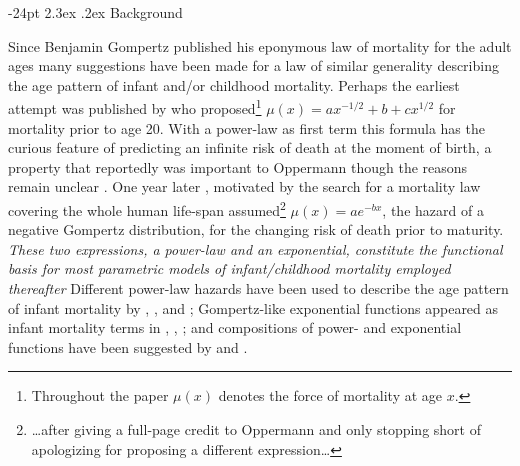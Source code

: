 \documentclass[10pt, twoside, parskip=half]{article}
\makeatletter
\renewcommand\section{\@startsection {section}{1}{\z@}%
                                   {-24pt}%
                                   {2.3ex \@plus.2ex}%
                                   {\normalfont\large\bfseries}}
\makeatother
\begin{document}
\setlength{\parskip}{0ex}

\newpage

\section{Background}\label{background}

Since Benjamin Gompertz published his eponymous law of mortality for the
adult ages many suggestions have been made for a law of similar
generality describing the age pattern of infant and/or childhood
mortality. Perhaps the earliest attempt was published by
\citet{Oppermann1870} who proposed\footnote{Throughout the paper
  \(\mu(x)\) denotes the force of mortality at age \(x\).}
\(\mu(x)=ax^{-1/2}+b+cx^{1/2}\) for mortality prior to age 20. With a
power-law as first term this formula has the curious feature of
predicting an infinite risk of death at the moment of birth, a property
that reportedly was important to Oppermann though the reasons remain
unclear \citep{Steffensen1930}. One year later \citet{Thiele1871},
motivated by the search for a mortality law covering the whole human
life-span assumed\footnote{\ldots{}after giving a full-page credit to
  Oppermann and only stopping short of apologizing for proposing a
  different expression\ldots{}} \(\mu(x) = ae^{-bx}\), the hazard of a
negative Gompertz distribution, for the changing risk of death prior to
maturity. \emph{These two expressions, a power-law and an exponential,
constitute the functional basis for most parametric models of
infant/childhood mortality employed thereafter} Different power-law
hazards have been used to describe the age pattern of infant mortality
by \citet{Brillinger1961}, \citet{Choe1981}, \citet{DeBeer2016} and
\citet{Berrut2016}; Gompertz-like exponential functions appeared as
infant mortality terms in \citet{Siler1979}, \citet{Mode1982},
\citet{Rogers1994}; and compositions of power- and exponential functions
have been suggested by \citet{Wittstein1883} and \citet{Heligman1980}.
\end{document}

